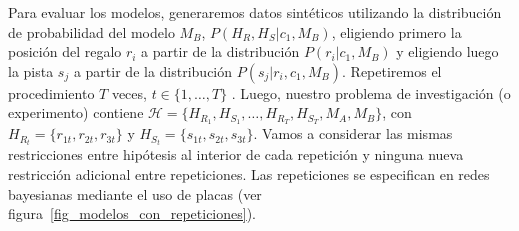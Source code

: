 \documentclass[a4paper,11pt]{book}
\theoremstyle{definition}
\begin{document}
Para evaluar los modelos, generaremos datos sint\'eticos utilizando la distribuci\'on de probabilidad del modelo $M_B$, $P(H_R,H_S|c_1,M_B)$, eligiendo primero la posici\'on del regalo $r_i$ a partir de la distribuci\'on $P(r_i|c_1,M_B)$ y eligiendo luego la pista $s_j$ a partir de la distribuci\'on $P(s_j|r_i,c_1,M_B)$.
%
Repetiremos el procedimiento $T$ veces, $t \in \{1, \dots, T\}$ .
%
Luego, nuestro problema de investigaci\'on (o experimento) contiene $\mathcal{H} = \{H_{R_1}, H_{S_1}, \dots, H_{R_T}, H_{S_T}, M_A, M_B\}$, con $H_{R_t} = \{r_{1t}, r_{2t}, r_{3t}\}$ y $H_{S_t} = \{s_{1t}, s_{2t}, s_{3t} \}$.
%
Vamos a considerar las mismas restricciones entre hip\'otesis al interior de cada repetici\'on y ninguna nueva restricci\'on adicional entre repeticiones.
%
Las repeticiones se especifican en redes bayesianas mediante el uso de placas (ver figura~\ref{fig_modelos_con_repeticiones}).
%
\end{document}
